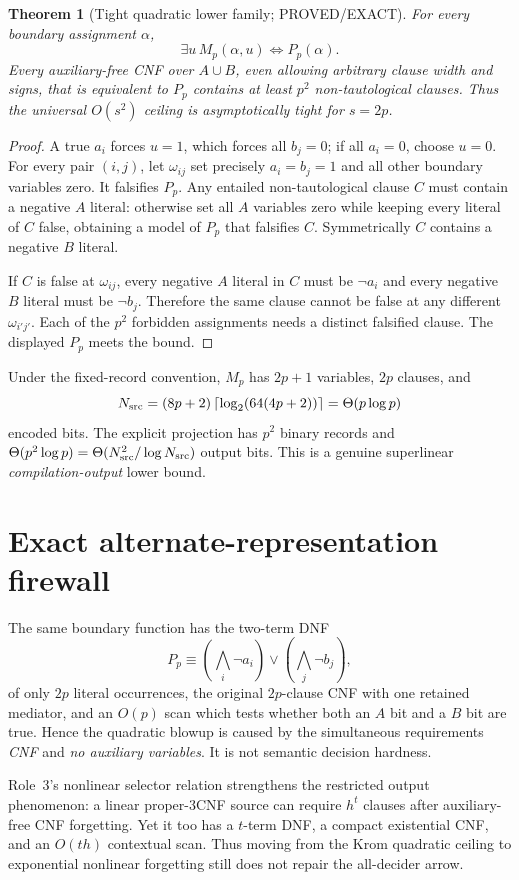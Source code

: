 \documentclass[11pt]{article}
\newtheorem{theorem}{Theorem}
\begin{document}
\begin{theorem}[Tight quadratic lower family; PROVED/EXACT]
For every boundary assignment $\alpha$,
\[
\exists u\,M_p(\alpha,u)\iff P_p(\alpha).
\]
Every auxiliary-free CNF over $A\cup B$, even allowing arbitrary clause width and signs, that is equivalent to $P_p$ contains at least $p^2$ non-tautological clauses. Thus the universal $O(s^2)$ ceiling is asymptotically tight for $s=2p$.
\end{theorem}
\begin{proof}
A true $a_i$ forces $u=1$, which forces all $b_j=0$; if all $a_i=0$, choose $u=0$. For every pair $(i,j)$, let $\omega_{ij}$ set precisely $a_i=b_j=1$ and all other boundary variables zero. It falsifies $P_p$. Any entailed non-tautological clause $C$ must contain a negative $A$ literal: otherwise set all $A$ variables zero while keeping every literal of $C$ false, obtaining a model of $P_p$ that falsifies $C$. Symmetrically $C$ contains a negative $B$ literal.

If $C$ is false at $\omega_{ij}$, every negative $A$ literal in $C$ must be $\neg a_i$ and every negative $B$ literal must be $\neg b_j$. Therefore the same clause cannot be false at any different $\omega_{i'j'}$. Each of the $p^2$ forbidden assignments needs a distinct falsified clause. The displayed $P_p$ meets the bound.
\end{proof}

Under the fixed-record convention, $M_p$ has $2p+1$ variables, $2p$ clauses, and
\[
N_{\rm src}=(8p+2)\left\lceil\log_2(64(4p+2))\right\rceil
=\Theta(p\log p)
\]
encoded bits. The explicit projection has $p^2$ binary records and
$\Theta(p^2\log p)=\Theta(N_{\rm src}^2/\log N_{\rm src})$ output bits. This is a genuine superlinear \emph{compilation-output} lower bound.

\section{Exact alternate-representation firewall}
The same boundary function has the two-term DNF
\[
P_p\equiv
\left(\bigwedge_i\neg a_i\right)\vee
\left(\bigwedge_j\neg b_j\right),
\]
of only $2p$ literal occurrences, the original $2p$-clause CNF with one retained mediator, and an $O(p)$ scan which tests whether both an $A$ bit and a $B$ bit are true. Hence the quadratic blowup is caused by the simultaneous requirements \emph{CNF} and \emph{no auxiliary variables}. It is not semantic decision hardness.

Role~3's nonlinear selector relation strengthens the restricted output phenomenon: a linear proper-3CNF source can require $h^t$ clauses after auxiliary-free CNF forgetting. Yet it too has a $t$-term DNF, a compact existential CNF, and an $O(th)$ contextual scan. Thus moving from the Krom quadratic ceiling to exponential nonlinear forgetting still does not repair the all-decider arrow.
\end{document}
